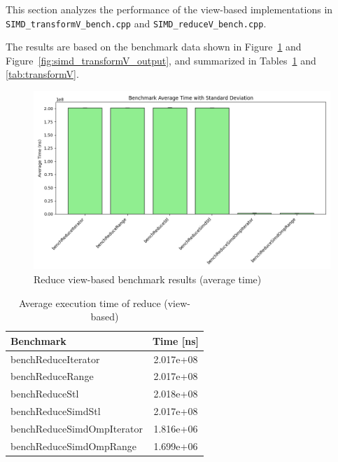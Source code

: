 This section analyzes the performance of the view-based implementations in \\
\texttt{SIMD\_transformV\_bench.cpp} and \texttt{SIMD\_reduceV\_bench.cpp}.

The results are based on the benchmark data shown in Figure~\ref{fig:simd_reduceV_output} and Figure~\ref{fig:simd_transformV_output}, and summarized in Tables~\ref{tab:reduceV} and \ref{tab:transformV}.

\begin{figure}[h!]
    \centering
    \includegraphics[width=0.9\linewidth]{img/simd_reduceV_output.txt_ex02.png}
    \caption{Reduce view-based benchmark results (average time)}
    \label{fig:simd_reduceV_output}
\end{figure}

\begin{table}[h!]
    \centering
    \begin{tabular}{|l|c|}
        \hline
        \textbf{Benchmark}         & \textbf{Time [ns]} \\
        \hline
        benchReduceIterator        & 2.017e+08          \\
        benchReduceRange           & 2.017e+08          \\
        benchReduceStl             & 2.018e+08          \\
        benchReduceSimdStl         & 2.017e+08          \\
        benchReduceSimdOmpIterator & 1.816e+06          \\
        benchReduceSimdOmpRange    & 1.699e+06          \\
        \hline
    \end{tabular}
    \caption{Average execution time of reduce (view-based)}
    \label{tab:reduceV}
\end{table}

